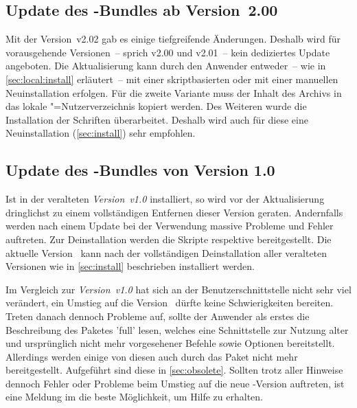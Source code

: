 \subsection{Update des \TUDScript-Bundles ab Version~2.00}
%
Mit der Version~v2.02 gab es einige tiefgreifende Änderungen. Deshalb wird für 
vorausgehende Versionen~-- sprich v2.00 und v2.01~-- kein dediziertes Update 
angeboten. Die Aktualisierung kann durch den Anwender entweder~-- wie in 
\autoref{sec:local:install} erläutert~-- mit einer skriptbasierten oder mit 
einer manuellen Neuinstallation erfolgen. Für die zweite Variante muss 
der Inhalt des Archivs
in das lokale "=Nutzerverzeichnis kopiert werden. Des Weiteren 
wurde die Installation der Schriften überarbeitet. Deshalb wird auch für diese 
eine Neuinstallation (\autoref{sec:install}) sehr empfohlen.
%


\subsection{Update des \TUDScript-Bundles von Version 1.0}
%
Ist \TUDScript in der veralteten \emph{Version~v1.0} installiert, so wird vor 
der Aktualisierung dringlichst zu einem vollständigen Entfernen dieser Version 
geraten. Andernfalls werden nach einem Update bei der Verwendung massive 
Probleme und Fehler auftreten. Zur Deinstallation werden die Skripte 
respektive
bereitgestellt. Die aktuelle Version~\vTUDScript{} kann nach der vollständigen 
Deinstallation aller veralteten Versionen wie in \autoref{sec:install} 
beschrieben installiert werden.

Im Vergleich zur \emph{Version~v1.0} hat sich an der Benutzerschnittstelle 
nicht sehr viel verändert, ein Umstieg auf die Version~\vTUDScript{} dürfte 
keine Schwierigkeiten bereiten. Treten danach dennoch Probleme auf, sollte der 
Anwender als erstes die Beschreibung des Paketes 'full' 
lesen, welches eine Schnittstelle zur Nutzung alter und ursprünglich nicht mehr 
vorgesehener Befehle sowie Optionen bereitstellt. Allerdings werden einige von 
diesen auch durch das Paket  nicht mehr bereitgestellt. 
Aufgeführt sind diese in \autoref{sec:obsolete}. Sollten trotz aller Hinweise 
dennoch Fehler oder Probleme beim Umstieg auf die neue \TUDScript-Version 
auftreten, ist eine Meldung im \Forum die beste Möglichkeit, um Hilfe zu 
erhalten.




